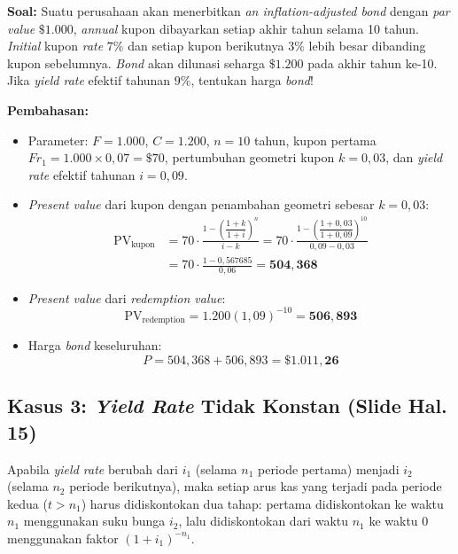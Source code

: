 \documentclass[11pt,a4paper]{article}
\begin{document}
\begin{examplebox}
\textbf{Soal:} Suatu perusahaan akan menerbitkan \textit{an inflation-adjusted bond} dengan \textit{par value} $\$1.000$, \textit{annual} kupon dibayarkan setiap akhir tahun selama 10 tahun. \textit{Initial} kupon \textit{rate} $7\%$ dan setiap kupon berikutnya $3\%$ lebih besar dibanding kupon sebelumnya. \textit{Bond} akan dilunasi seharga $\$1.200$ pada akhir tahun ke-10. Jika \textit{yield rate} efektif tahunan $9\%$, tentukan harga \textit{bond}!

\tcblower
\textbf{Pembahasan:}
\begin{itemize}[topsep=2pt, itemsep=2pt]
    \item Parameter: $F = 1.000$, $C = 1.200$, $n = 10$ tahun, kupon pertama $Fr_1 = 1.000 \times 0{,}07 = \$70$, pertumbuhan geometri kupon $k = 0{,}03$, dan \textit{yield rate} efektif tahunan $i = 0{,}09$.
    \item \textit{Present value} dari kupon dengan penambahan geometri sebesar $k = 0{,}03$:
    \begin{align*}
        \text{PV}_{\text{kupon}} &= 70 \cdot \frac{1 - \left(\dfrac{1+k}{1+i}\right)^n}{i - k} = 70 \cdot \frac{1 - \left(\dfrac{1 + 0{,}03}{1 + 0{,}09}\right)^{10}}{0{,}09 - 0{,}03} \\
        &= 70 \cdot \frac{1 - 0{,}567685}{0{,}06} = \mathbf{504{,}368}
    \end{align*}
    \item \textit{Present value} dari \textit{redemption value}:
    \[
        \text{PV}_{\text{redemption}} = 1.200(1{,}09)^{-10} = \mathbf{506{,}893}
    \]
    \item Harga \textit{bond} keseluruhan:
    \[
        P = 504{,}368 + 506{,}893 = \mathbf{\$1.011{,}26}
    \]
\end{itemize}
\end{examplebox}

\subsection{Kasus 3: \textit{Yield Rate} Tidak Konstan (Slide Hal. 15)}

Apabila \textit{yield rate} berubah dari $i_1$ (selama $n_1$ periode pertama) menjadi $i_2$ (selama $n_2$ periode berikutnya), maka setiap arus kas yang terjadi pada periode kedua ($t > n_1$) harus didiskontokan dua tahap: pertama didiskontokan ke waktu $n_1$ menggunakan suku bunga $i_2$, lalu didiskontokan dari waktu $n_1$ ke waktu $0$ menggunakan faktor $(1 + i_1)^{-n_1}$.
\end{document}
